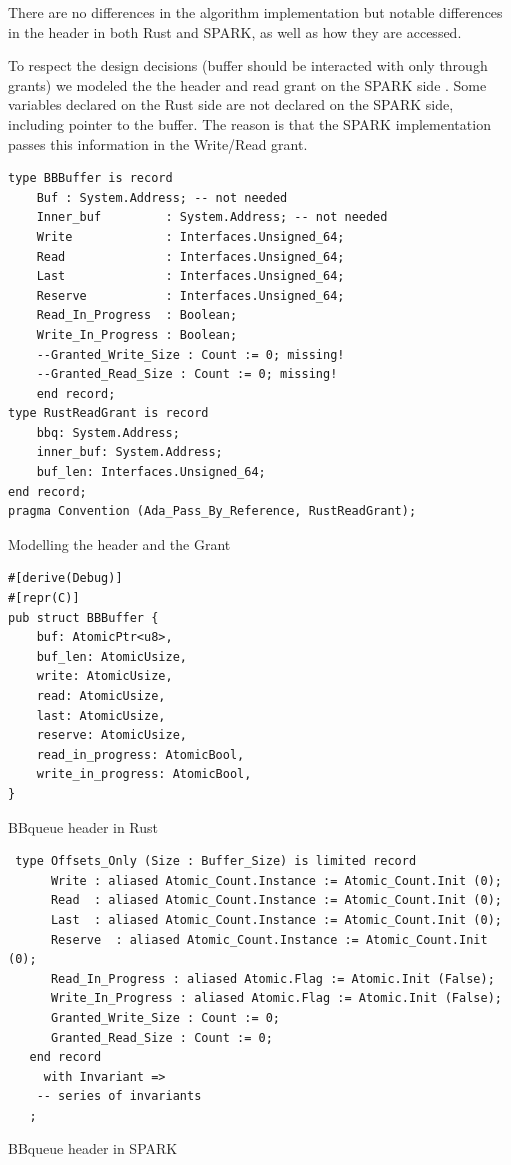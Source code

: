 \documentclass[nomenclature, english, bibtex]{kththesis}
\begin{document}
There are no differences in the algorithm implementation but notable differences in the header in both Rust and SPARK, as well as how they are accessed.

To respect the design decisions (buffer should be interacted with only through grants) we modeled the the header and read grant on the SPARK side . Some variables declared on the Rust side are not declared on the SPARK side, including pointer to the buffer. The reason is that the SPARK implementation passes this information in the Write/Read grant.

\begin{listing}[ht!]
\begin{verbatim}
type BBBuffer is record
    Buf : System.Address; -- not needed
    Inner_buf         : System.Address; -- not needed
    Write             : Interfaces.Unsigned_64;
    Read              : Interfaces.Unsigned_64;
    Last              : Interfaces.Unsigned_64;
    Reserve           : Interfaces.Unsigned_64;
    Read_In_Progress  : Boolean;
    Write_In_Progress : Boolean;
    --Granted_Write_Size : Count := 0; missing!
    --Granted_Read_Size : Count := 0; missing!
    end record;
type RustReadGrant is record
    bbq: System.Address;
    inner_buf: System.Address;
    buf_len: Interfaces.Unsigned_64;
end record;
pragma Convention (Ada_Pass_By_Reference, RustReadGrant);
\end{verbatim}
\caption{Modelling the header and the Grant}
\label{lst:bbqueueinspark}
\end{listing}

\begin{listing}[!ht]
\begin{verbatim}
#[derive(Debug)]
#[repr(C)]
pub struct BBBuffer {
    buf: AtomicPtr<u8>,
    buf_len: AtomicUsize,
    write: AtomicUsize,
    read: AtomicUsize,
    last: AtomicUsize,
    reserve: AtomicUsize,
    read_in_progress: AtomicBool,
    write_in_progress: AtomicBool,
}
\end{verbatim}
\caption[BBqueue header in Rust]{BBqueue header in Rust}
\label{lst:rust_bbqueue_header}
\end{listing}

\begin{listing}[!ht]

\begin{verbatim}
 type Offsets_Only (Size : Buffer_Size) is limited record
      Write : aliased Atomic_Count.Instance := Atomic_Count.Init (0);
      Read  : aliased Atomic_Count.Instance := Atomic_Count.Init (0);
      Last  : aliased Atomic_Count.Instance := Atomic_Count.Init (0);
      Reserve  : aliased Atomic_Count.Instance := Atomic_Count.Init (0);
      Read_In_Progress : aliased Atomic.Flag := Atomic.Init (False);
      Write_In_Progress : aliased Atomic.Flag := Atomic.Init (False);
      Granted_Write_Size : Count := 0;
      Granted_Read_Size : Count := 0;
   end record
     with Invariant =>
    -- series of invariants
   ;
\end{verbatim}
\caption[BBqueue header in SPARK]{BBqueue header in SPARK}
\label{lst:SPARK_bbqueue_header}
\end{listing}
\end{document}
